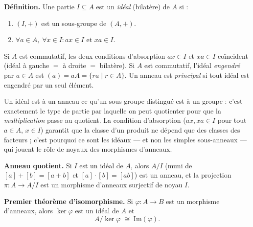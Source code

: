 \decsep{}


\begin{tcolorbox}[thmbox]
  \textbf{Définition.}\enspace%
  Une partie $I \subseteq A$ est un \emph{idéal} (bilatère) de $A$ si :
  \begin{enumerate}
    \item $(I, +)$ est un sous-groupe de $(A, +)$.
    \item $\forall a \in A,\; \forall x \in I : ax \in I$ et $xa \in I$.
  \end{enumerate}
  Si $A$ est commutatif, les deux conditions d'absorption $ax \in I$ et
  $xa \in I$ coïncident (idéal à gauche $=$ à droite $=$ bilatère).
  Si $A$ est commutatif, l'idéal \emph{engendré} par $a \in A$ est
  $(a) = aA = \{ra \mid r \in A\}$.
  Un anneau est \emph{principal} si tout idéal est engendré
  par un seul élément.
\end{tcolorbox}

\begin{significationintuitive}
  Un idéal est à un anneau ce qu'un sous-groupe distingué est à un groupe : c'est
  exactement le type de partie par laquelle on peut quotienter pour que la
  \emph{multiplication} passe au quotient. La condition d'absorption ($ax, xa \in I$
  pour tout $a \in A$, $x \in I$) garantit que la classe d'un produit ne dépend que
  des classes des facteurs ; c'est pourquoi ce sont les idéaux — et non les simples
  sous-anneaux — qui jouent le rôle de noyaux des morphismes d'anneaux.
\end{significationintuitive}

\begin{tcolorbox}[thmbox]
  \textbf{Anneau quotient.}\enspace%
  Si $I$ est un idéal de $A$, alors $A/I$ (muni de $[a]+[b]=[a+b]$ et
  $[a]\cdot[b]=[ab]$) est un anneau, et la projection $\pi : A \to A/I$
  est un morphisme d'anneaux surjectif de noyau $I$.

  \medskip
  \textbf{Premier théorème d'isomorphisme.}\enspace%
  Si $\varphi : A \to B$ est un morphisme d'anneaux, alors $\ker\varphi$
  est un idéal de $A$ et
  \[
    A/\ker\varphi \;\cong\; \mathrm{Im}(\varphi).
  \]
\end{tcolorbox}

